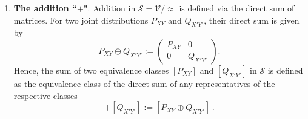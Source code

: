 \documentclass[aps,pra,11pt,onecolumn,nofootinbib,tightenlines]{revtex4-2}
\theoremstyle{definition}
\begin{document}
\begin{enumerate}
We say that two joint probability distributions $P_{XY}$ and $Q_{X'Y'}$ are similar, denoted
\begin{equation}
    P_{XY} \approx Q_{X'Y'}  \,,
\end{equation}
if one can be obtained from the other by permuting rows or columns, and/or inserting or deleting rows or columns consisting entirely of zeros.
In other words, $P_{XY}$ and $Q_{X'Y'}$ represent the same distribution up to reordering of outcomes and inclusion or exclusion of impossible events. In yet other words, there is $R_{X''Y''}$ such that both $P_{XY}$ and $Q_{X'Y'}$ can be relabeled and embedded into $R_{X''Y''}$ when we lift the notion of relabeling and embedding to non-normalized distributions.
For $P \in \mathcal{V}$, we define
    $[P] := \{ P' \in \mathcal{V} \mid P \approx P' \}$
as the equivalence class of $P$ under the relation $\approx$. The elements of the semiring are then given by the quotient set
\begin{equation}
    \mathcal{S} := \mathcal{V} / \approx,
\end{equation}
which consists of all equivalence classes of $\mathcal{V}$ under the similarity relation $\approx$.

\item \textbf{The addition ``$+$"}.
Addition in $\mathcal{S} = \mathcal{V}/\!\approx$ is defined via the direct sum of matrices. For two joint distributions $P_{XY}$ and $Q_{X'Y'}$, their direct sum is given by
\begin{equation}
    P_{XY} \oplus Q_{X'Y'} := \begin{pmatrix}
P_{XY} & 0 \\
0 & Q_{X'Y'}
\end{pmatrix}.
\end{equation}
Hence, the sum of two equivalence classes $[P_{XY}]$ and $[Q_{X'Y'}]$ in $\mathcal{S}$ is defined as the equivalence class of the direct sum of any representatives of the respective classes
\begin{equation}
    [P_{XY}] + [Q_{X'Y'}] := [P_{XY} \oplus Q_{X'Y'}] \,.
\end{equation}


\end{enumerate}
\end{document}
